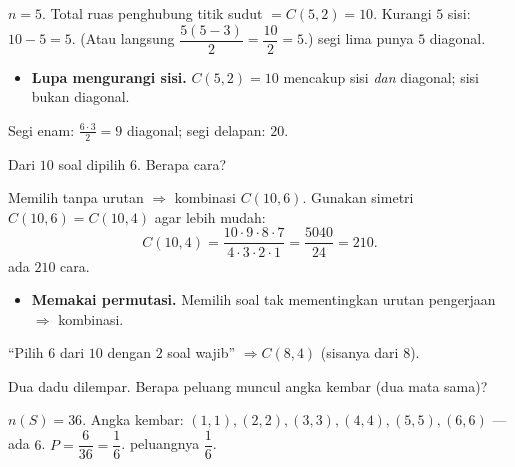 \jawab
{} $n=5$. Total ruas penghubung titik sudut $=C(5,2)=10$.
 Kurangi $5$ sisi: $10-5=5$. (Atau langsung $\dfrac{5(5-3)}{2}
=\dfrac{10}{2}=5$.)
\jadi segi lima punya $5$ diagonal.

\begin{jebakan}
\begin{itemize}[leftmargin=*,topsep=2pt]
  \item \textbf{Lupa mengurangi sisi.} $C(5,2)=10$ mencakup sisi \emph{dan}
  diagonal; sisi bukan diagonal.
\end{itemize}
\end{jebakan}

\begin{variasi}
Segi enam: $\frac{6\cdot3}{2}=9$ diagonal; segi delapan: $20$.
\end{variasi}

\begin{soalbox}{}
Dari $10$ soal dipilih $6$. Berapa cara?
\end{soalbox}

\jawab
{} Memilih tanpa urutan $\Rightarrow$ kombinasi $C(10,6)$.
 Gunakan simetri $C(10,6)=C(10,4)$ agar lebih mudah:
\[
C(10,4)=\frac{10\cdot9\cdot8\cdot7}{4\cdot3\cdot2\cdot1}=\frac{5040}{24}=210.
\]
\jadi ada $210$ cara.

\begin{jebakan}
\begin{itemize}[leftmargin=*,topsep=2pt]
  \item \textbf{Memakai permutasi.} Memilih soal tak mementingkan urutan
  pengerjaan $\Rightarrow$ kombinasi.
\end{itemize}
\end{jebakan}

\begin{variasi}
``Pilih $6$ dari $10$ dengan $2$ soal wajib'' $\Rightarrow C(8,4)$ (sisanya dari
$8$).
\end{variasi}

\begin{soalbox}{}
Dua dadu dilempar. Berapa peluang muncul angka kembar (dua mata sama)?
\end{soalbox}

\jawab
{} $n(S)=36$.
 Angka kembar: $(1,1),(2,2),(3,3),(4,4),(5,5),(6,6)$ --- ada $6$.
 $P=\dfrac{6}{36}=\dfrac16$.
\jadi peluangnya $\dfrac16$.

